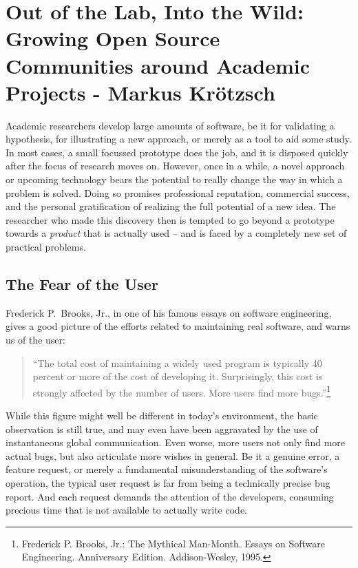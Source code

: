 \chapter{Out of the Lab, Into the Wild: Growing Open Source Communities around Academic Projects - Markus Kr\"{o}tzsch}
Academic researchers develop large amounts of software, be it for validating a hypothesis, for illustrating a new approach, or merely as a tool to aid some study. In most cases, a small focussed prototype does the job, and it is disposed quickly after the focus of research moves on. However, once in a while, a novel approach or upcoming technology bears the potential to really change the way in which a problem is solved. Doing so promises professional reputation, commercial success, and the personal gratification of realizing the full potential of a new idea. The researcher who made this discovery then is tempted to go beyond a prototype towards a \emph{product} that is actually used -- and is faced by a completely new set of practical problems.

\section*{The Fear of the User}

Frederick P.\ Brooks, Jr., in one of his famous essays on software engineering, gives a good picture of the efforts related to maintaining real software, and warns us of the user:
%
\begin{quote}
``The total cost of maintaining a widely used program is typically 40 percent or more of the cost of developing it. Surprisingly, this cost is strongly affected by the number of users. More users find more bugs.''\footnote{Frederick P. Brooks, Jr.: The Mythical Man-Month. Essays on Software Engineering. Anniversary Edition. Addison-Wesley, 1995.}
\end{quote}
%
While this figure might well be different in today's environment, the basic observation is still true, and may even have been aggravated by the use of instantaneous global communication. Even worse, more users not only find more actual bugs, but also articulate more wishes in general. Be it a genuine error, a feature request, or merely a fundamental misunderstanding of the software's operation, the typical user request is far from being a technically precise bug report. And each request demands the attention of the developers, consuming precious time that is not available to actually write code.

